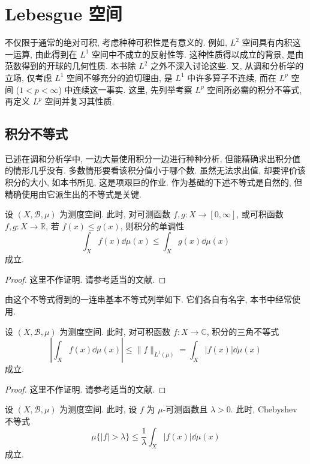 
\section{Lebesgue 空间}\label{sec:2.3}

不仅限于通常的绝对可积, 考虑种种可积性是有意义的. 例如, $L^{2}$ 空间具有内积这一运算, 由此得到在 $L^{1}$ 空间中不成立的反射性等. 这种性质得以成立的背景, 是由范数得到的开球的几何性质. 本书除 $L^{2}$ 之外不深入讨论这些. 又, 从调和分析学的立场, 仅考虑 $L^{1}$ 空间不够充分的迫切理由, 是 $L^{1}$ 中许多算子不连续, 而在 $L^{p}$ 空间 ($1 < p < \infty$) 中连续这一事实. 这里, 先列举考察 $L^{p}$ 空间所必需的积分不等式, 再定义 $L^{p}$ 空间并复习其性质.

\subsection*{积分不等式}

已述在调和分析学中, 一边大量使用积分一边进行种种分析, 但能精确求出积分值的情形几乎没有. 多数情形要看该积分值小于哪个数. 虽然无法求出值, 却要评价该积分的大小, 如本书所见, 这是项艰巨的作业. 作为基础的下述不等式是自然的, 但精确使用由它派生出的不等式是关键.

\begin{theorem}\label{thm:2.15}
设 $(X, \mathcal{B}, \mu)$ 为测度空间. 此时, 对可测函数 $f, g: X \to [0, \infty]$, 或可积函数 $f, g: X \to \mathbb{R}$, 若 $f(x) \leq g(x)$, 则积分的单调性
\[
\int_{X}f(x)\dd\mu(x) \leq \int_{X}g(x)\dd\mu(x)
\]
成立.
\end{theorem}

\begin{proof}
这里不作证明. 请参考适当的文献.
\end{proof}

由这个不等式得到的一连串基本不等式列举如下. 它们各自有名字, 本书中经常使用.

\begin{theorem}\label{thm:2.16}
设 $(X, \mathcal{B}, \mu)$ 为测度空间. 此时, 对可积函数 $f: X \to \mathbb{C}$, 积分的三角不等式
\[
\left|\int_{X}f(x)\dd\mu(x)\right| \leq \|f\|_{L^{1}(\mu)} = \int_{X}|f(x)|\dd\mu(x)
\]
成立.
\end{theorem}

\begin{proof}
这里不作证明. 请参考适当的文献.
\end{proof}

\begin{theorem}\label{thm:2.17}
设 $(X, \mathcal{B}, \mu)$ 为测度空间. 此时, 设 $f$ 为 $\mu$-可测函数且 $\lambda > 0$. 此时, Chebyshev 不等式
\begin{equation}\tag{2.6}
\mu\{|f| > \lambda\} \leq \frac{1}{\lambda}\int_{X}|f(x)|\dd\mu(x)
\label{eq:2.6}
\end{equation}
成立.
\end{theorem}

